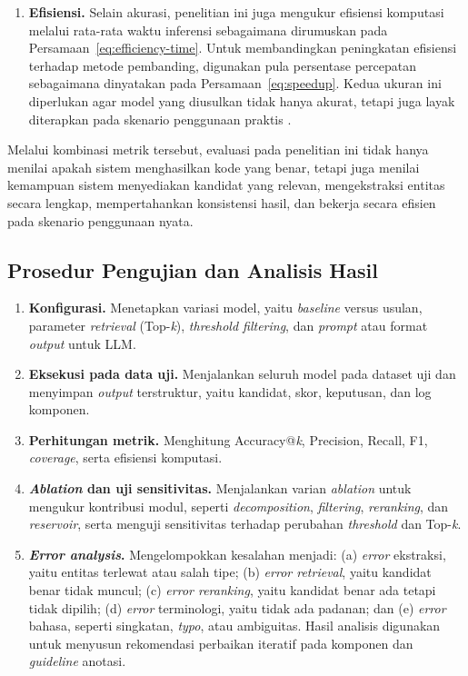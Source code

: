 \begin{enumerate}
    \item \textbf{Efisiensi.} Selain akurasi, penelitian ini juga mengukur efisiensi komputasi melalui rata-rata waktu inferensi sebagaimana dirumuskan pada Persamaan~\ref{eq:efficiency-time}. Untuk membandingkan peningkatan efisiensi terhadap metode pembanding, digunakan pula persentase percepatan sebagaimana dinyatakan pada Persamaan~\ref{eq:speedup}. Kedua ukuran ini diperlukan agar model yang diusulkan tidak hanya akurat, tetapi juga layak diterapkan pada skenario penggunaan praktis \citep{gilani_cde-mapper_2025,park_development_2026}.
\end{enumerate}

Melalui kombinasi metrik tersebut, evaluasi pada penelitian ini tidak hanya menilai apakah sistem menghasilkan kode yang benar, tetapi juga menilai kemampuan sistem menyediakan kandidat yang relevan, mengekstraksi entitas secara lengkap, mempertahankan konsistensi hasil, dan bekerja secara efisien pada skenario penggunaan nyata.

\subsection{Prosedur Pengujian dan Analisis Hasil}

\begin{enumerate}
    \item \textbf{Konfigurasi.} Menetapkan variasi model, yaitu \textit{baseline} versus usulan, parameter \textit{retrieval} (Top-\textit{k}), \textit{threshold filtering}, dan \textit{prompt} atau format \textit{output} untuk LLM.
    \item \textbf{Eksekusi pada data uji.} Menjalankan seluruh model pada dataset uji dan menyimpan \textit{output} terstruktur, yaitu kandidat, skor, keputusan, dan log komponen.
    \item \textbf{Perhitungan metrik.} Menghitung Accuracy@\textit{k}, Precision, Recall, F1, \textit{coverage}, serta efisiensi komputasi.
    \item \textbf{\textit{Ablation} dan uji sensitivitas.} Menjalankan varian \textit{ablation} untuk mengukur kontribusi modul, seperti \textit{decomposition}, \textit{filtering}, \textit{reranking}, dan \textit{reservoir}, serta menguji sensitivitas terhadap perubahan \textit{threshold} dan Top-\textit{k}.
    \item \textbf{\textit{Error analysis}.} Mengelompokkan kesalahan menjadi: (a) \textit{error} ekstraksi, yaitu entitas terlewat atau salah tipe; (b) \textit{error retrieval}, yaitu kandidat benar tidak muncul; (c) \textit{error reranking}, yaitu kandidat benar ada tetapi tidak dipilih; (d) \textit{error} terminologi, yaitu tidak ada padanan; dan (e) \textit{error} bahasa, seperti singkatan, \textit{typo}, atau ambiguitas. Hasil analisis digunakan untuk menyusun rekomendasi perbaikan iteratif pada komponen dan \textit{guideline} anotasi.
\end{enumerate}

